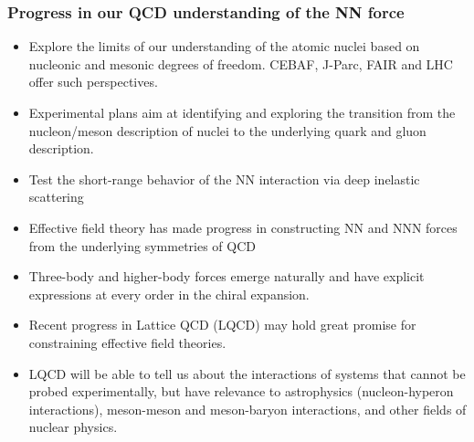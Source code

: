\documentclass[compress]{beamer}
\begin{document}
\frame
{
\frametitle{Progress in our QCD understanding of the NN force}

\begin{small}
{\scriptsize
    \begin{itemize}
\item  Explore the limits of our understanding of the atomic nuclei based
on nucleonic and mesonic degrees of freedom.  CEBAF, J-Parc, FAIR and LHC offer such perspectives.
\item Experimental plans aim at identifying and exploring the transition
from the nucleon/meson description of nuclei to the underlying quark and 
gluon description.
\item Test the short-range behavior of the NN interaction via deep inelastic scattering
\item Effective field theory has made progress in constructing NN and NNN
forces from the underlying symmetries of QCD 
\item Three-body and higher-body forces emerge naturally and have explicit expressions at 
every order in the chiral expansion. 
\item Recent progress in Lattice QCD (LQCD) may hold great promise for constraining
effective field theories.
\item LQCD will be able to tell us about the interactions of systems 
that cannot be probed experimentally, but have relevance to astrophysics (nucleon-hyperon interactions), meson-meson and meson-baryon interactions, and other fields of nuclear physics. 
    \end{itemize}
}
\end{small}
}
\end{document}
